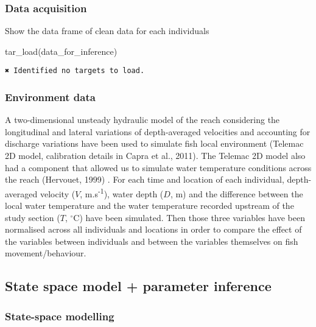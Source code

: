 \documentclass[
  letterpaper,
  DIV=11,
  numbers=noendperiod]{scrartcl}
\newenvironment{Shaded}{\begin{snugshade}}{\end{snugshade}}
\newcommand{\FunctionTok}[1]{\textcolor[rgb]{0.28,0.35,0.67}{#1}}
\newcommand{\NormalTok}[1]{\textcolor[rgb]{0.00,0.23,0.31}{#1}}
\begin{document}
\hypertarget{data-acquisition}{%
\subsubsection{Data acquisition}\label{data-acquisition}}

Show the data frame of clean data for each individuals

\begin{Shaded}
\begin{Highlighting}[]
\FunctionTok{tar\_load}\NormalTok{(data\_for\_inference)}
\end{Highlighting}
\end{Shaded}

\begin{verbatim}
✖ Identified no targets to load.
\end{verbatim}

\hypertarget{environment-data}{%
\subsubsection{Environment data}\label{environment-data}}

A two-dimensional unsteady hydraulic model of the reach considering the
longitudinal and lateral variations of depth-averaged velocities and
accounting for discharge variations have been used to simulate fish
local environment (Telemac 2D model, calibration details in Capra et
al., 2011). The Telemac 2D model also had a component that allowed us to
simulate water temperature conditions across the reach (Hervouet, 1999)
. For each time and location of each individual, depth-averaged velocity
(\(V\), m.s\textsuperscript{-1}), water depth (\(D\), m) and the
difference between the local water temperature and the water temperature
recorded upstream of the study section (\(T\), \(^{\circ}\)C) have been
simulated. Then those three variables have been normalised across all
individuals and locations in order to compare the effect of the
variables between individuals and between the variables themselves on
fish movement/behaviour.

\hypertarget{state-space-model-parameter-inference}{%
\subsection{State space model + parameter
inference}\label{state-space-model-parameter-inference}}

\hypertarget{state-space-modelling}{%
\subsubsection{State-space modelling}\label{state-space-modelling}}
\end{document}
